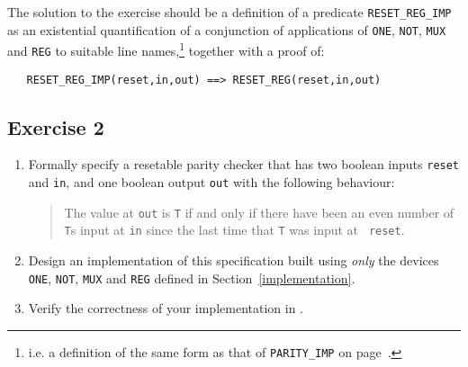 The solution to the exercise should be a definition of a predicate
{\small\verb|RESET_REG_IMP|} as an existential quantification  of a conjunction
of applications  of  {\small\verb|ONE|}, {\small\verb|NOT|}, {\small\verb|MUX|}
and {\small\verb|REG|} to suitable line  names,\footnote{i.e.   a definition of
the same form as that of {\small\tt PARITY\_IMP} on page~\pageref{parity-imp}.}
together with a proof of:

{\small\baselineskip\HOLSpacing\begin{verbatim}
   RESET_REG_IMP(reset,in,out) ==> RESET_REG(reset,in,out)
\end{verbatim}}


\subsection{Exercise 2}

\begin{enumerate}
\item Formally specify a resetable parity checker that has two boolean
  inputs {\small\tt reset} and {\small\tt in}, and one boolean output
  {\small\tt out} with the following behaviour:
  \begin{quote}
    The value at {\small\tt out} is {\small\tt T} if and only if there
    have been an even number of {\small\tt T}s input at {\small\tt in}
    since the last time that {\small\tt T} was input at {\small\tt
      reset}.
  \end{quote}
\item Design an implementation of this specification built using {\it
    only\/} the devices {\small\verb|ONE|}, {\small\verb|NOT|},
  {\small\verb|MUX|} and {\small\verb|REG|} defined in
  Section~\ref{implementation}.
\item Verify the correctness of your implementation in \HOL.
\end{enumerate}

